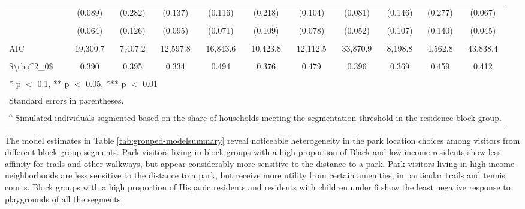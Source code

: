 \documentclass[3p, authoryear, review]{elsarticle} %
\begin{document}
\begin{landscape}
\begin{table}
{\begin{tabular}[t]{lcccccccccc}
 & (0.089) & (0.282) & (0.137) & (0.116) & (0.218) & (0.104) & (0.081) & (0.146) & (0.277) & (0.067)\\
\cellcolor{gray!6}{Other Sport} & \cellcolor{gray!6}{-0.112 *} & \cellcolor{gray!6}{-0.306 **} & \cellcolor{gray!6}{-0.425 ***} & \cellcolor{gray!6}{-0.328 ***} & \cellcolor{gray!6}{-0.613 ***} & \cellcolor{gray!6}{-0.088} & \cellcolor{gray!6}{-0.244 ***} & \cellcolor{gray!6}{-0.133} & \cellcolor{gray!6}{-0.426 ***} & \cellcolor{gray!6}{-0.243 ***}\\
 & (0.064) & (0.126) & (0.095) & (0.071) & (0.109) & (0.078) & (0.052) & (0.107) & (0.140) & (0.045)\\
\midrule
\cellcolor{gray!6}{Num.Obs.} & \cellcolor{gray!6}{6,589} & \cellcolor{gray!6}{2,546} & \cellcolor{gray!6}{3,939} & \cellcolor{gray!6}{6,926} & \cellcolor{gray!6}{3,478} & \cellcolor{gray!6}{4,839} & \cellcolor{gray!6}{11,683} & \cellcolor{gray!6}{2,703} & \cellcolor{gray!6}{1,751} & \cellcolor{gray!6}{15,546}\\
AIC & 19,300.7 & 7,407.2 & 12,597.8 & 16,843.6 & 10,423.8 & 12,112.5 & 33,870.9 & 8,198.8 & 4,562.8 & 43,838.4\\
\cellcolor{gray!6}{Log Likelihood} & \cellcolor{gray!6}{-9,640.3} & \cellcolor{gray!6}{-3,693.6} & \cellcolor{gray!6}{-6,288.9} & \cellcolor{gray!6}{-8,411.8} & \cellcolor{gray!6}{-5,201.9} & \cellcolor{gray!6}{-6,046.2} & \cellcolor{gray!6}{-16,925.4} & \cellcolor{gray!6}{-4,089.4} & \cellcolor{gray!6}{-2,271.4} & \cellcolor{gray!6}{-21,909.2}\\
\$\textbackslash{}rho\textasciicircum{}2\_0\$ & 0.390 & 0.395 & 0.334 & 0.494 & 0.376 & 0.479 & 0.396 & 0.369 & 0.459 & 0.412\\
\bottomrule
\multicolumn{11}{l}{\textsuperscript{} * p $<$ 0.1, ** p $<$ 0.05, *** p $<$ 0.01}\\
\multicolumn{11}{l}{\textsuperscript{} Standard errors in parentheses.}\\
\multicolumn{11}{l}{\textsuperscript{a} Simulated individuals segmented based on the share of households meeting the segmentation threshold in the residence block group.}\\
\end{tabular}}
\end{table}
\end{landscape}

The model estimates in Table \ref{tab:grouped-modelsummary} reveal noticeable
heterogeneity in the park location choices among visitors from different block
group segments. Park visitors living in block groups with a high proportion of
Black and low-income residents show less affinity for trails and other walkways,
but appear considerably more sensitive to the distance to a park. Park visitors
living in high-income neighborhoods are less sensitive to the distance to a
park, but receive more utility from certain amenities, in particular trails and
tennis courts. Block groups with a high proportion of Hispanic residents and
residents with children under 6 show the least negative response to playgrounds
of all the segments.
\end{document}
